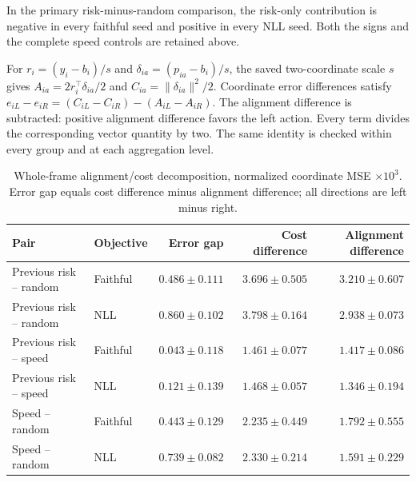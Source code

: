 In the primary risk-minus-random comparison, the risk-only contribution
is negative in every faithful seed and positive in every NLL seed.
Both the signs and the complete speed controls are retained above.


For $r_i=(y_i-b_i)/s$ and $\delta_{ia}=(p_{ia}-b_i)/s$, the saved
two-coordinate scale $s$ gives
$A_{ia}=2r_i^\top\delta_{ia}/2$ and
$C_{ia}=\|\delta_{ia}\|^2/2$.
Coordinate error differences satisfy
$e_{iL}-e_{iR}=(C_{iL}-C_{iR})-(A_{iL}-A_{iR})$.
The alignment difference is subtracted: positive alignment difference favors
the left action. Every term divides the corresponding vector quantity by two.
The same identity is checked within every group and at each aggregation level.

\begin{table}[ht]
\centering\small
\caption{Whole-frame alignment/cost decomposition, normalized coordinate MSE
$\times10^3$. Error gap equals cost difference minus alignment difference;
all directions are left minus right.}
\label{tab:optional-exposure-alignment}
\begin{tabular}{llrrr}
\toprule
Pair & Objective & Error gap & Cost difference & Alignment difference\\
\midrule
Previous risk -- random & Faithful & $0.486\pm0.111$ & $3.696\pm0.505$ & $3.210\pm0.607$\\
Previous risk -- random & NLL & $0.860\pm0.102$ & $3.798\pm0.164$ & $2.938\pm0.073$\\
Previous risk -- speed & Faithful & $0.043\pm0.118$ & $1.461\pm0.077$ & $1.417\pm0.086$\\
Previous risk -- speed & NLL & $0.121\pm0.139$ & $1.468\pm0.057$ & $1.346\pm0.194$\\
Speed -- random & Faithful & $0.443\pm0.129$ & $2.235\pm0.449$ & $1.792\pm0.555$\\
Speed -- random & NLL & $0.739\pm0.082$ & $2.330\pm0.214$ & $1.591\pm0.229$\\
\bottomrule
\end{tabular}
\end{table}

